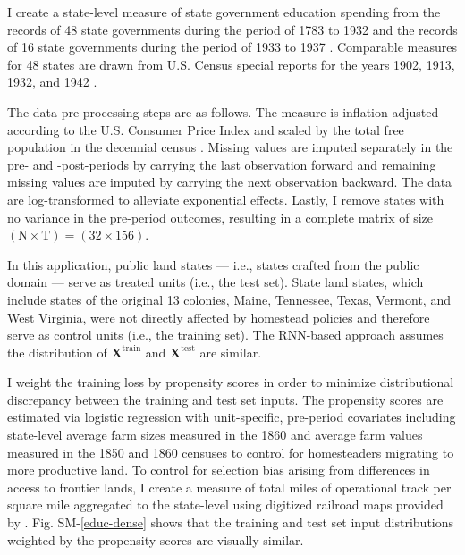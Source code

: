 I create a state-level measure of state government education spending from the records of 48 state governments during the period of 1783 to 1932 \citep{sylla1993sources} and the records of 16 state governments during the period of 1933 to 1937 \citep{sylla1995sourcesa,sylla1995sourcesb}. Comparable measures for 48 states are drawn from U.S. Census special reports for the years 1902, 1913, 1932, and 1942 \citep{haines2010}.

The data pre-processing steps are as follows. The measure is inflation-adjusted according to the U.S. Consumer Price Index \citep{williamson2017seven} and scaled by the total free population in the decennial census \citep{haines2010}. Missing values are imputed separately in the pre- and -post-periods by carrying the last observation forward and remaining missing values are imputed by carrying the next observation backward. The data are log-transformed to alleviate exponential effects. Lastly, I remove states with no variance in the pre-period outcomes, resulting in a complete matrix of size $(\text{N} \times \text{T})= (32 \times 156)$. 

In this application, public land states --- i.e., states crafted from the public domain --- serve as treated units (i.e., the test set). State land states, which include states of the original 13 colonies, Maine, Tennessee, Texas, Vermont, and West Virginia, were not directly affected by homestead policies and therefore serve as control units (i.e., the training set). The RNN-based approach assumes the distribution of $\boldsymbol{X}^{\text{train}}$ and $\boldsymbol{X}^{\text{test}}$ are similar.

I weight the training loss by  propensity scores in order to minimize distributional discrepancy between the training and test set inputs. The propensity scores are estimated via logistic regression with unit-specific, pre-period covariates including state-level average farm sizes measured in the 1860 and average farm values measured in the 1850 and 1860 censuses \citep{haines2010} to control for homesteaders migrating to more productive land. To control for selection bias arising from differences in access to frontier lands, I create a measure of total miles of operational track per square mile aggregated to the state-level using digitized railroad maps provided by \citet{atack2013use}. Fig. SM-\ref{educ-dense} shows that the training and test set input distributions weighted by the propensity scores are visually similar.%

